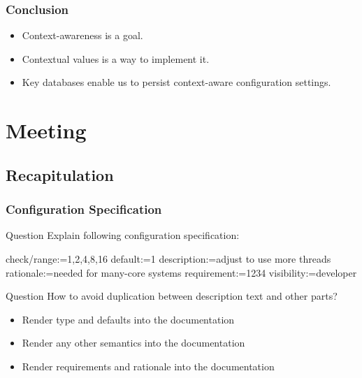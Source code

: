 \begin{frame}
	\frametitle{Conclusion}

	\begin{itemize}[<+-| alert@+>]
	\item Context-awareness is a goal.
	\item Contextual values is a way to implement it.
	\item Key databases enable us to persist context-aware configuration settings.
	\end{itemize}
\end{frame}



\section{Meeting}



\subsection{Recapitulation}

\begin{frame}[fragile]
	\frametitle{Configuration Specification}
	\begin{alertblock}{Question}
	Explain following configuration specification:
	\end{alertblock}


	\begin{code}
	  check/range:=1,2,4,8,16
	  default:=1
	  description:=adjust to use more threads
	  rationale:=needed for many-core systems
	  requirement:=1234
	  visibility:=developer
	\end{code}
\end{frame}

\begin{frame}
	\begin{alertblock}{Question}
	How to avoid duplication between description text and other parts?
	\end{alertblock}

	\pause

	\begin{itemize}
	\item Render type and defaults into the documentation
	\item Render any other semantics into the documentation
	\item Render requirements and rationale into the documentation
	\end{itemize}
\end{frame}

